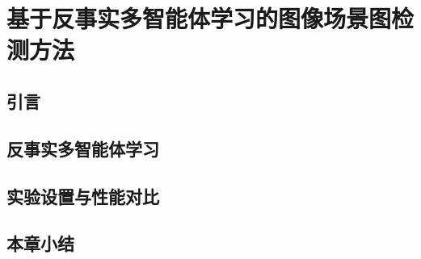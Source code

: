 \chapter{基于反事实多智能体学习的图像场景图检测方法}

\section{引言}

\section{反事实多智能体学习}

\section{实验设置与性能对比}

\section{本章小结}